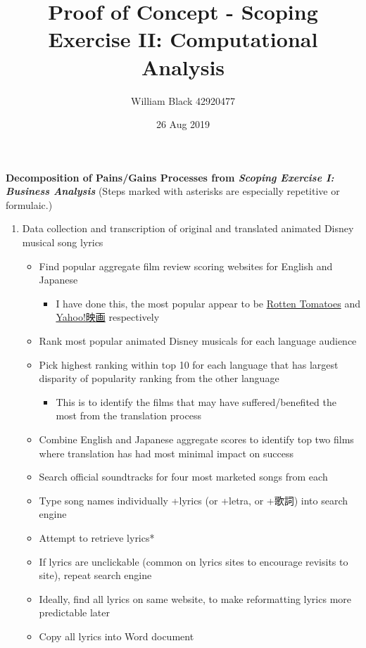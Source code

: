 \documentclass[12pt]{article}
\title{\textbf{Proof of Concept - Scoping Exercise II: \newline Computational Analysis}}
\date{26 Aug 2019}
\author{William Black 42920477}
\begin{document}
 
\maketitle \textbf{\small{Decomposition of Pains/Gains Processes from \textit{Scoping Exercise I: Business Analysis}}}
(Steps marked with asterisks are especially repetitive or formulaic.)
\begin{enumerate}
    \item Data collection and transcription of original and translated animated Disney musical song lyrics
    \begin{itemize}
        \item Find popular aggregate film review scoring websites for English and Japanese 
        \begin{itemize}
            \item I have done this, the most popular appear to be \href{https://rottentomatoes.com/}{Rotten Tomatoes} and \\\href{https://movies.yahoo.co.jp}{Yahoo!映画} respectively
        \end{itemize}
        \item Rank most popular animated Disney musicals for each language audience
        \item Pick highest ranking within top 10 for each language that has largest disparity of popularity ranking from the other language
        \begin{itemize}
            \item This is to identify the films that may have suffered/benefited the most from the translation process
        \end{itemize}
        \item Combine English and Japanese aggregate scores to identify top two films where translation has had most minimal impact on success
        \item Search official soundtracks for four most marketed songs from each
        \item Type song names individually +lyrics (or +letra, or +歌詞) into search engine
        \item Attempt to retrieve lyrics*
        \item If lyrics are unclickable (common on lyrics sites to encourage revisits to site), repeat search engine
        \item Ideally, find all lyrics on same website, to make reformatting lyrics more predictable later
        \item Copy all lyrics into Word document

\end{itemize}
\end{enumerate}
\end{document}
